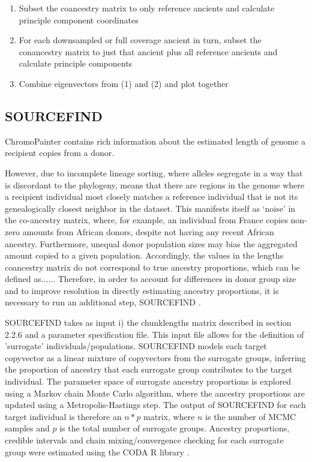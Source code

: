\begin{enumerate}
\item Subset the coancestry matrix to only reference ancients and calculate principle component coordinates
\item For each downsampled or full coverage ancient in turn, subset the conancestry matrix to just that ancient plus all reference ancients and calculate principle components
\item Combine eigenvectors from (1) and (2) and plot together
\end{enumerate}

\subsection{SOURCEFIND}

ChromoPainter contains rich information about the estimated length of genome a recipient copies from a donor.

However, due to incomplete lineage sorting, where alleles segregate in a way that is discordant to the phylogeny, means that there are regions in the genome where a recipient individual most closely matches a reference individual that is not its genealogically closest neighbor in the dataset. This manifests itself as `noise' in the co-ancestry matrix, where, for example, an individual from France copies non-zero amounts from African donors, despite not having any recent African ancestry.  Furthermore, unequal donor population sizes may bias the aggregated amount copied to a given population. Accordingly, the values in the lengths coancestry matrix do not correspond to true ancestry proportions, which can be defined as...... Therefore, in order to account for differences in donor group size and to improve resolution in directly estimating ancestry proportions, it is necessary to run an additional step, SOURCEFIND \cite{Chacon-Duque2018}.

SOURCEFIND takes as input i) the chunklengths matrix described in section 2.2.6 and a parameter specification file. This input file allows for the definition of 'surrogate' individuals/populations. SOURCEFIND models each target copyvector as a linear mixture of copyvectors from the surrogate groups, inferring the proportion of ancestry that each surrogate group contributes to the target individual. The parameter space of surrogate ancestry proportions is explored using a Markov chain Monte Carlo algorithm, where the ancestry proportions are updated using a Metropolis-Hastings step. The output of SOURCEFIND for each target individual is therefore an $n*p$ matrix, where $n$ is the number of MCMC samples and $p$ is the total number of surrogate groups. Ancestry proportions, credible intervals and chain mixing/convergence checking for each surrogate group were estimated using the CODA R library \cite{oro22547}.

